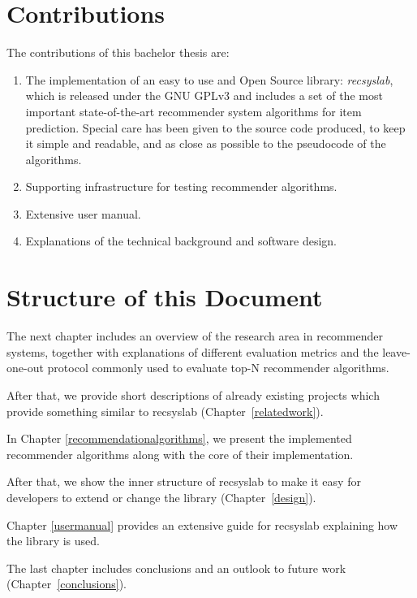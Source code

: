\section{Contributions}
The contributions of this bachelor thesis are:
\begin{enumerate}
    \item The implementation of an easy to use and Open Source library: \textit{recsyslab}, which is released under the GNU GPLv3\cite{gpl} and includes a set of the most important state-of-the-art recommender system algorithms for item prediction. Special care has been given to the source code produced, to keep it simple and readable, and as close as possible to the pseudocode of the algorithms.
    \item Supporting infrastructure for testing recommender algorithms.
    \item Extensive user manual.
    \item Explanations of the technical background and software design.
\end{enumerate}


\section{Structure of this Document}
The next chapter includes an overview of the research area in recommender systems,
together with explanations of different evaluation metrics and the leave-one-out
protocol commonly used to evaluate top-N recommender algorithms.

After that, we provide short descriptions of already existing 
projects which provide something similar to recsyslab (Chapter~\ref{relatedwork}).

In Chapter \ref{recommendationalgorithms}, we present the implemented recommender
algorithms along with the core of their implementation. 

After that, we show the inner structure of recsyslab
to make it easy for developers to extend or change the library (Chapter~\ref{design}).

Chapter \ref{usermanual} provides an extensive guide for recsyslab explaining
how the library is used.

The last chapter includes conclusions and an outlook to future work (Chapter~\ref{conclusions}).
